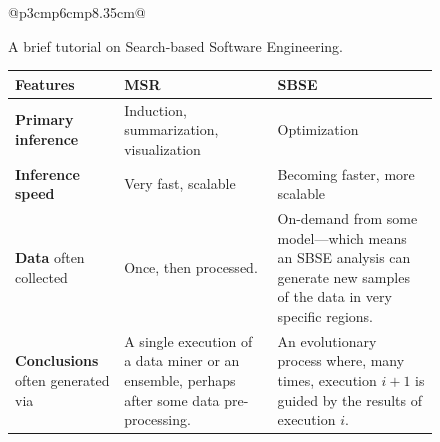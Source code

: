 \documentclass[sigconf,anonymous,review]{acmart}
\begin{document}
\begin{figure}
{\begin{tabular}{@{}p{3cm}p{6cm}p{8.35cm}@{}}
{\begin{minipage}[b]{0.67\linewidth}
                        \end{minipage}	
                }
            \end{tabular}
        }
        \caption{A {brief} tutorial on Search-based Software Engineering.}
        \label{fig:sbse_crash}
\end{figure}

\begin{figure}[t]
    \centering
    \small
    \begin{tabular}{@{}p{3cm}p{6cm}p{8.35cm}@{}}
                
                \toprule
                \textbf{Features} & \hspace{2cm}\textbf{MSR} & \hspace{3cm}\textbf{SBSE} \\ \midrule
                \rowcolor[HTML]{EFEFEF} \textbf{Primary inference} & Induction, summarization, visualization & Optimization \\
                \textbf{Inference speed} & Very fast, scalable & Becoming faster, more scalable\\
                \rowcolor[HTML]{EFEFEF}\textbf{Data} often collected &
                 Once,  then processed.
                &
                On-demand
                from  some model---which means an SBSE analysis can 
                generate new samples of the data in very  specific regions.
                \\ 
                \textbf{Conclusions} often 
                generated via
                &
                A single  execution of a data miner or an ensemble, 
                perhaps after some data pre-processing. 
                &
                An evolutionary process  where, many times, execution $i+1$ is guided
                by the results of execution $i$.
                \\ 
                 

\end{tabular}
\end{figure}
\end{document}
